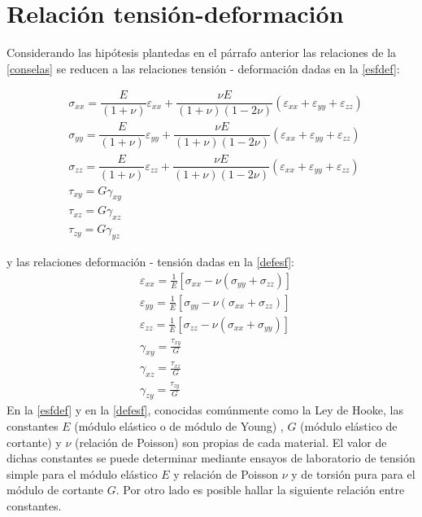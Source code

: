 \documentclass[../notas medios.tex]{subfiles}
\begin{document}
\section{Relación tensión-deformación}

Considerando las hipótesis plantedas en el párrafo anterior las relaciones de la  \cref{conselas} se reducen a las relaciones tensión - deformación dadas en la  \cref{esfdef}: 

\begin{equation} \label{esfdef}
\begin{split}
& {\sigma_{xx}} = \dfrac{E}{(1 + \nu)} \varepsilon_{xx} + \dfrac{\nu E}{(1 + \nu)(1-2 \nu)} (\varepsilon_{xx} + \varepsilon_{yy} + \varepsilon_{zz}) \\
& {\sigma _{yy}} =\dfrac{E}{(1 + \nu)} \varepsilon_{yy} + \dfrac{\nu E}{(1 + \nu)(1-2 \nu)} (\varepsilon_{xx} + \varepsilon_{yy} + \varepsilon_{zz}) \\
& {\sigma _{zz}} = \dfrac{E}{(1 + \nu)} \varepsilon_{zz} + \dfrac{\nu E}{(1 + \nu)(1-2 \nu)} (\varepsilon_{xx} + \varepsilon_{yy} + \varepsilon_{zz}) \\
& {\tau _{xy}} = {G} \gamma_{xy}  \\
& {\tau _{xz}} = {G} \gamma_{xz}  \\
& {\tau _{zy}} ={G} \gamma_{yz} 	
\end{split}
\end{equation}

y  las relaciones deformación - tensión dadas en la \cref{defesf}: 
\begin{equation} \label{defesf}
\begin{split}
& {\varepsilon _{xx}} = \frac{1}{E}\left[ {{\sigma _{xx}} - \nu ({\sigma _{yy}} + {\sigma _{zz}})} \right] \\
& {\varepsilon _{yy}} = \frac{1}{E}\left[ {{\sigma _{yy}} - \nu ({\sigma _{xx}} + {\sigma _{zz}})} \right] \\
& {\varepsilon _{zz}} = \frac{1}{E}\left[ {{\sigma _{zz}} - \nu ({\sigma _{xx}} + {\sigma _{yy}})} \right] \\
& {\gamma _{xy}} = \frac{{{\tau _{xy}}}}{G} \\
& {\gamma _{xz}} = \frac{{{\tau _{xz}}}}{G} \\
& {\gamma _{zy}} = \frac{{{\tau _{zy}}}}{G}
\end{split}
\end{equation}
%
En la \cref{esfdef} y en la \cref{defesf}, conocidas comúnmente como la Ley de Hooke, las constantes $E$ (módulo elástico o de módulo de Young) , $G$ (módulo elástico de cortante) y $\nu$ (relación de Poisson) son propias de cada material. El valor de dichas constantes se puede determinar mediante ensayos de laboratorio de tensión simple para el módulo elástico $E$ y relación de Poisson $\nu$ y de torsión pura para el módulo de cortante $G$. Por otro lado es posible hallar la siguiente relación entre constantes.  
\end{document}
